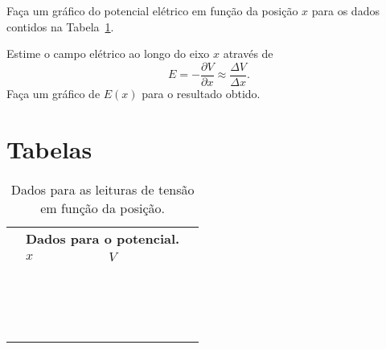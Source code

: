 \begin{question}[type={exam}]{7}
Faça um gráfico do potencial elétrico em função da posição $x$ para os dados contidos na Tabela~\ref{Tab:ValoresPotencialEletricoEixoX}.
\end{question}

\begin{question}[type={exam}]{2}
Estime o campo elétrico ao longo do eixo $x$ através de
\begin{equation}
    E = -\frac{\partial V}{\partial x} \approx \frac{\Delta V}{\Delta x}.
\end{equation}
%
Faça um gráfico de $E(x)$ para o resultado obtido.
\end{question}

\vfill
\pagebreak
\section{Tabelas}


\begin{table}
\label{Tab:ValoresPotencialEletricoEixoX}
	\begin{center}
		\begin{tabular}{cp{25mm}p{25mm}c}
		\toprule
		&\multicolumn{2}{l}{\textbf{Dados para o potencial.}} \\
		\cmidrule{2-3}
		& $x$ & $V$ \\
		\cmidrule{2-3}
		& \cellcolor[gray]{0.89} & \cellcolor[gray]{0.92} & \\
		& \cellcolor[gray]{0.95} & \cellcolor[gray]{0.97} \\
		& \cellcolor[gray]{0.89} & \cellcolor[gray]{0.92} \\
		& \cellcolor[gray]{0.95} & \cellcolor[gray]{0.97} \\
		& \cellcolor[gray]{0.89} & \cellcolor[gray]{0.92} \\
		& \cellcolor[gray]{0.95} & \cellcolor[gray]{0.97} \\
		& \cellcolor[gray]{0.89} & \cellcolor[gray]{0.92} \\
		& \cellcolor[gray]{0.95} & \cellcolor[gray]{0.97} \\
		& \cellcolor[gray]{0.89} & \cellcolor[gray]{0.92} \\
		& \cellcolor[gray]{0.95} & \cellcolor[gray]{0.97} \\
		& \cellcolor[gray]{0.89} & \cellcolor[gray]{0.92} \\
		& \cellcolor[gray]{0.95} & \cellcolor[gray]{0.97} \\
		& \cellcolor[gray]{0.89} & \cellcolor[gray]{0.92} \\
		& \cellcolor[gray]{0.95} & \cellcolor[gray]{0.97} \\
		& \cellcolor[gray]{0.89} & \cellcolor[gray]{0.92} \\
		& \cellcolor[gray]{0.95} & \cellcolor[gray]{0.97} \\
		\cmidrule{2-3}
		\bottomrule
		\end{tabular}
	\end{center}
	\caption{Dados para as leituras de tensão em função da posição.}
\end{table}
